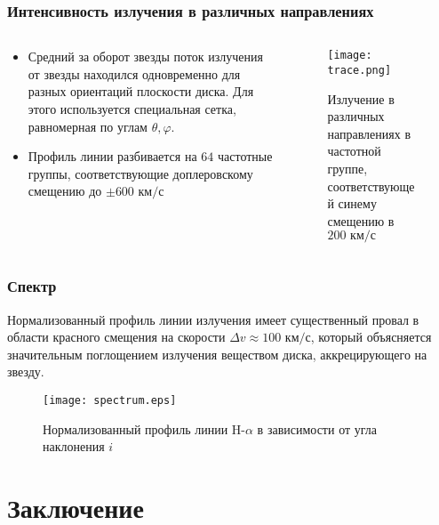 \documentclass[unicode,aspectratio=43]{beamer}
\begin{document}
\begin{frame}\frametitle{Интенсивность излучения в различных направлениях}
\begin{columns}\begin{column}{.6\textwidth}
\begin{itemize}
\item Средний за оборот звезды поток излучения от звезды находился одновременно
для разных ориентаций плоскости диска. Для этого используется специальная сетка,
равномерная по углам $\theta, \varphi$.
\item Профиль линии разбивается на $64$ частотные группы, соответствующие
доплеровскому смещению до $\pm 600 \text{ км}/\text{с}$
\end{itemize}
\end{column}\begin{column}{.4\textwidth}
\begin{figure}[ht!]
\centering
\texttt{[image: trace.png]} %
\caption{Излучение в различных направлениях в частотной группе, соответствующей синему
смещению в $200 \text{ км}/\text{с}$}
\end{figure}
\end{column}\end{columns}
\end{frame}

\begin{frame}\frametitle{Спектр}
Нормализованный профиль линии излучения имеет существенный провал в области
красного смещения на скорости $\Delta v \approx 100 \text{ км}/\text{с}$, который объясняется значительным поглощением излучения веществом диска, аккрецирующего на звезду.
\begin{figure}[ht!]
\centering
\texttt{[image: spectrum.eps]} %
\caption{Нормализованный профиль линии H-$\alpha$ в зависимости от угла наклонения $i$}
\end{figure}	
\end{frame}

\section{Заключение}
\end{document}
